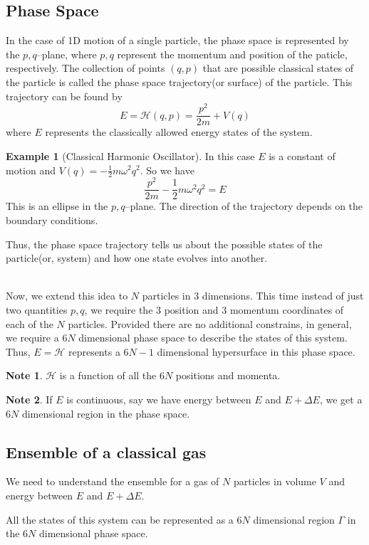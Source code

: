 \documentclass[10pt, a4paper]{extarticle}
\theoremstyle{definition}
\newtheorem{eg}{Example}
\newtheorem*{note*}{Note}
\begin{document}
\subsection{Phase Space}
In the case of 1D motion of a single particle, the phase space is represented by the $p,q$--plane, where $p,q$ represent the momentum and position of the paticle, respectively. The collection of points $(q,p)$ that are possible classical states of the particle is called the phase space trajectory(or surface) of the particle. This trajectory can be found by
\[E=\mathcal{H}(q,p)=\frac{p^2}{2m}+V(q)\]
where $E$ represents the classically allowed energy states of the system.
\begin{eg}[Classical Harmonic Oscillator]
	In this case $E$ is a constant of motion and $V(q)=-\frac{1}{2}m\omega^2q^2$. So we have
	\[\frac{p^2}{2m}-\frac{1}{2}m\omega^2q^2=E\]
	This is an ellipse in the $p,q$--plane. The direction of the trajectory depends on the boundary conditions.
\end{eg}
\begin{framed}
	Thus, the phase space trajectory tells us about the possible states of the particle(or, system) and how one state evolves into another.
\end{framed}
\hfill\\
Now, we extend this idea to $N$ particles in 3 dimensions. This time instead of just two quantities $p,q$, we require the 3 position and 3 momentum coordinates of each of the $N$ particles. Provided there are no additional constrains, in general, we require a $6N$ dimensional phase space to describe the states of this system. Thus, $E=\mathcal{H}$ represents a $6N-1$ dimensional hypersurface in this phase space.
\begin{note*}
	$\mathcal{H}$ is a function of all the $6N$ positions and momenta.
\end{note*}
\begin{note*}
	If $E$ is continuous, say we have energy between $E$ and $E+\Delta E$, we get a $6N$ dimensional region in the phase space.
\end{note*}

\subsection{Ensemble of a classical gas}
We need to understand the ensemble for a gas of $N$ particles in volume $V$ and energy between $E$ and $E+\Delta E$.

All the states of this system can be represented as a $6N$ dimensional region $\Gamma$ in the $6N$ dimensional phase space.
\end{document}
